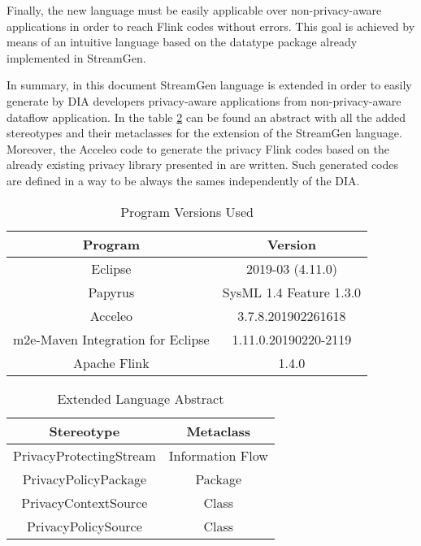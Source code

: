 Finally, the new language must be easily applicable over non-privacy-aware applications in order to reach Flink codes without errors. This goal is achieved by means of an intuitive language based on the datatype package already implemented in StreamGen.

In summary, in this document StreamGen language is extended in order to easily generate by DIA developers privacy-aware applications from non-privacy-aware dataflow application. In the table \ref{Extended Language Abstract} can be found an abstract with all the added stereotypes and their metaclasses for the extension of the StreamGen language. Moreover, the Acceleo code to generate the privacy Flink codes based on the already existing privacy library presented in \cite{privacypoliciesarticle} are written. Such generated codes are defined in a way to be always the sames independently of the DIA.

\begin{table}[h!]
\centering
	\begin{tabular}{||c|c||} 
	\hline\hline
	Program & Version \\ [1ex] 
	\hline\hline
	Eclipse & 2019-03 (4.11.0)  \\
	\hline
	Papyrus & SysML 1.4 Feature 1.3.0  \\
	\hline
	Acceleo & 3.7.8.201902261618  \\
	\hline
	m2e-Maven Integration for Eclipse & 1.11.0.20190220-2119  \\
	\hline
	Apache Flink & 1.4.0  \\
	\hline\hline
	\end{tabular}
\caption{Program Versions Used}
\label{Program Versions Used}
\end{table}

\begin{table}[h!]
\centering
	\begin{tabular}{||c|c||} 
	\hline\hline
	Stereotype & Metaclass \\ [1ex] 
	\hline\hline
	PrivacyProtectingStream & Information Flow  \\
	\hline
	PrivacyPolicyPackage & Package  \\
	\hline
	PrivacyContextSource & Class  \\
	\hline
	PrivacyPolicySource & Class  \\
	\hline\hline
	\end{tabular}
\caption{Extended Language Abstract}
\label{Extended Language Abstract}
\end{table}


